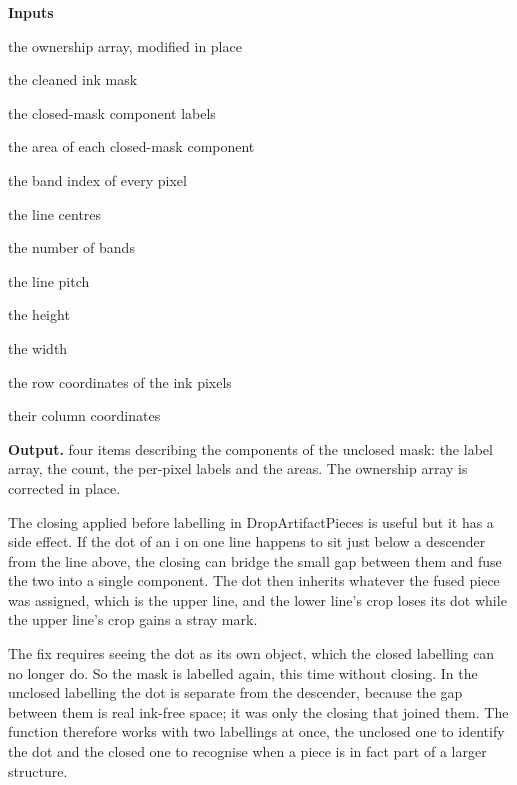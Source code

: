 \noindent\textbf{Inputs}
\begin{description}[leftmargin=2.2em,style=nextline,font=\normalfont\ttfamily]\setlength\itemsep{1pt}
  \item[{own}] \normalfont the ownership array, modified in place
  \item[{mask}] \normalfont the cleaned ink mask
  \item[{lab}] \normalfont the closed-mask component labels
  \item[{area}] \normalfont the area of each closed-mask component
  \item[{region}] \normalfont the band index of every pixel
  \item[{centres}] \normalfont the line centres
  \item[{L}] \normalfont the number of bands
  \item[{P}] \normalfont the line pitch
  \item[{H}] \normalfont the height
  \item[{W}] \normalfont the width
  \item[{ys}] \normalfont the row coordinates of the ink pixels
  \item[{xs}] \normalfont their column coordinates
\end{description}

\noindent\textbf{Output.} four items describing the components of the unclosed mask: the label array, the count, the per-pixel labels and the areas. The ownership array is corrected in place.


The closing applied before labelling in DropArtifactPieces is useful but it has a side effect. If the dot of an i on one line happens to sit just below a descender from the line above, the closing can bridge the small gap between them and fuse the two into a single component. The dot then inherits whatever the fused piece was assigned, which is the upper line, and the lower line's crop loses its dot while the upper line's crop gains a stray mark.


The fix requires seeing the dot as its own object, which the closed labelling can no longer do. So the mask is labelled again, this time without closing. In the unclosed labelling the dot is separate from the descender, because the gap between them is real ink-free space; it was only the closing that joined them. The function therefore works with two labellings at once, the unclosed one to identify the dot and the closed one to recognise when a piece is in fact part of a larger structure.


